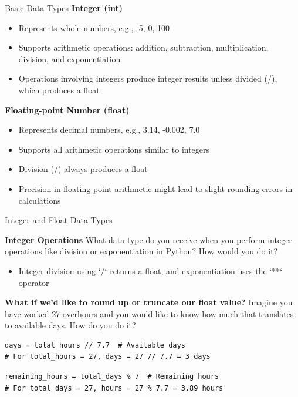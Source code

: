 \documentclass[
	11pt, 
]{beamer}
\begin{document}

\begin{frame}{Basic Data Types}
\textbf{Integer (int)}

    \begin{itemize}
            \item Represents whole numbers, e.g., -5, 0, 100
            \item Supports arithmetic operations: addition, subtraction, multiplication, division, and exponentiation
            \item Operations involving integers produce integer results unless divided (/), which produces a float
    \end{itemize} \bigskip

\textbf{Floating-point Number (float)}

    \begin{itemize}
            \item Represents decimal numbers, e.g., 3.14, -0.002, 7.0
            \item Supports all arithmetic operations similar to integers
            \item Division (/) always produces a float
            \item Precision in floating-point arithmetic might lead to slight rounding errors in calculations
    \end{itemize}
    
\end{frame}

\begin{frame}[fragile]{Integer and Float Data Types}


\begin{block}{\textbf{Integer Operations}}
What data type do you receive when you perform integer operations like division or exponentiation in Python? How would you do it?
\end{block}

\pause
\begin{itemize}
    \item Integer division using `/` returns a float, and exponentiation uses the `**` operator
\end{itemize}
\pause

\begin{block}{\textbf{What if we'd like to round up or truncate our float value?}}
Imagine you have worked 27 overhours and you would like to know how much that translates to available days. How do you do it?
\end{block}
\pause



\begin{verbatim}
days = total_hours // 7.7  # Available days
# For total_hours = 27, days = 27 // 7.7 = 3 days
\end{verbatim}
\begin{verbatim}
remaining_hours = total_days % 7  # Remaining hours
# For total_days = 27, hours = 27 % 7.7 = 3.89 hours
\end{verbatim}

\end{frame}
\end{document}
